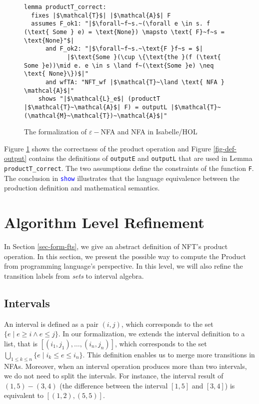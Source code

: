 \documentclass[a4paper,UKenglish,cleveref, autoref, thm-restate]{lipics-v2021}
\begin{document}
\begin{figure}[hbt!]
	\begin{lstlisting}
lemma productT_correct:
  fixes |$\mathcal{T}$| |$\mathcal{A}$| F
  assumes F_ok1: "|$\forall~f~s.~(\forall e \in s. f (\text{ Some } e) = \text{None}) \mapsto \text{ F}~f~s = \text{None}"$|
      and F_ok2: "|$\forall~f~s.~\text{F }f~s = $|
            |$\text{Some }(\cup \{\text{the }(f (\text{ Some }e))\mid e. e \in s \land f~(\text{Some }e) \neq \text{ None}\})$|"
      and wfTA: "NFT_wf |$\mathcal{T}~\land \text{ NFA } \mathcal{A}$|"
    shows "|$\mathcal{L}_e$| (productT |$\mathcal{T}~\mathcal{A}$| F) = outputL |$\mathcal{T}~(\mathcal{M}~\mathcal{T})~\mathcal{A}$|"

	\end{lstlisting}
\caption{The formalization of $\varepsilon-$NFA and NFA in Isabelle/HOL}
\label{fig-def-product-correct}
\end{figure}

Figure \ref{fig-def-product-correct} shows the correctness of the product operation and Figure \ref{fig-def-output} contains the definitions of \texttt{outputE} and \texttt{outputL} that are used in Lemma \texttt{productT\_correct}.
The two assumptions define the constraints of the function \texttt{F}.
The conclusion in \textcolor{blue}{\texttt{show}} illustrates 
that the language equivalence between the production definition and mathematical semantics.

\section{Algorithm Level Refinement}
\label{sec_alg_refinement}
In Section \ref{sec-form-fts}, we give an abstract definition of NFT's product operation. In this section, we present the possible way to compute the Product from programming language's perspective.
In this level, we will also refine the transition labels from \emph{sets} to interval algebra.

\subsection{Intervals}
An interval is defined as a pair $(i, j)$, which corresponds to the set $\{e \mid e \geq i \land e \leq j\}$. In our formalization, we extends the interval definition to a list, that is $[(i_1, j_1), \ldots, (i_n, j_n)]$, which corresponds to the set $\bigcup_{1\leq k\leq n}\{e \mid i_k \leq e \leq i_n\}$. This definition enables us to merge more transitions in NFAs. Moreover, when an interval operation produces more than two intervals, we do not need to split the intervals. For instance, the interval result of $(1, 5) - (3, 4)$ (the difference between the interval $[1, 5]$ and $[3, 4]$) is equivalent to $[(1, 2), (5, 5)]$.
\end{document}
